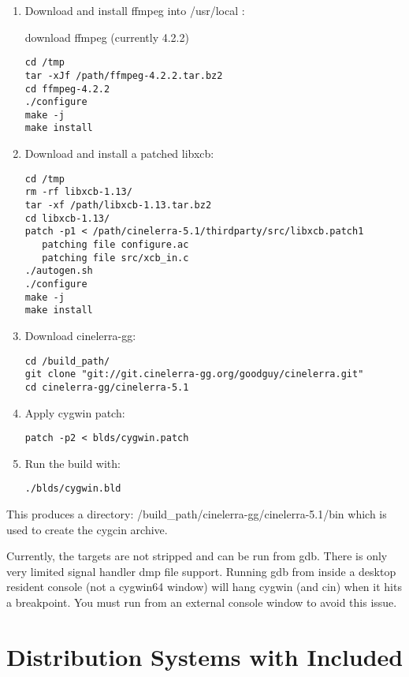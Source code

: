 \begin{enumerate}
\item Download and install ffmpeg into /usr/local :

  download ffmpeg (currently 4.2.2)
\begin{lstlisting}[style=sh]
cd /tmp
tar -xJf /path/ffmpeg-4.2.2.tar.bz2
cd ffmpeg-4.2.2
./configure
make -j
make install
\end{lstlisting}

\item Download and install a patched libxcb:
\begin{lstlisting}[style=sh]
cd /tmp
rm -rf libxcb-1.13/
tar -xf /path/libxcb-1.13.tar.bz2
cd libxcb-1.13/
patch -p1 < /path/cinelerra-5.1/thirdparty/src/libxcb.patch1
   patching file configure.ac
   patching file src/xcb_in.c
./autogen.sh
./configure
make -j
make install
\end{lstlisting}
\item Download cinelerra-gg:
\begin{lstlisting}[style=sh]
cd /build_path/
git clone "git://git.cinelerra-gg.org/goodguy/cinelerra.git"
cd cinelerra-gg/cinelerra-5.1
\end{lstlisting}
\item Apply cygwin patch:
\begin{lstlisting}[style=sh]
patch -p2 < blds/cygwin.patch
\end{lstlisting}
\item Run the build with:
\begin{lstlisting}[style=sh]
./blds/cygwin.bld
\end{lstlisting}
\end{enumerate}

This produces a directory: /build\_path/cinelerra-gg/cinelerra-5.1/bin
which is used to create the cygcin archive.

Currently, the targets are not stripped and can be run from gdb.
There is only very limited signal handler dmp file support.
Running gdb from inside a desktop resident console (not a cygwin64
window) will hang cygwin (and cin) when it hits a breakpoint.  You
must run from an external console window to avoid this issue.


\section{Distribution Systems with \CGG{} Included}%
\label{sec:distribution_systems_with_cinelerra_included}

